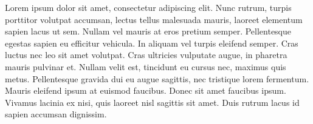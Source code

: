 \documentclass[main_article.tex]{subfiles}
\begin{document}
Lorem ipsum dolor sit amet, consectetur adipiscing elit. Nunc rutrum, turpis porttitor volutpat accumsan, lectus tellus malesuada mauris, laoreet elementum sapien lacus ut sem. Nullam vel mauris at eros pretium semper. Pellentesque egestas sapien eu efficitur vehicula. In aliquam vel turpis eleifend semper. Cras luctus nec leo sit amet volutpat. Cras ultricies vulputate augue, in pharetra mauris pulvinar et. Nullam velit est, tincidunt eu cursus nec, maximus quis metus. Pellentesque gravida dui eu augue sagittis, nec tristique lorem fermentum. Mauris eleifend ipsum at euismod faucibus. Donec sit amet faucibus ipsum. Vivamus lacinia ex nisi, quis laoreet nisl sagittis sit amet. Duis rutrum lacus id sapien accumsan dignissim.
\end{document}
